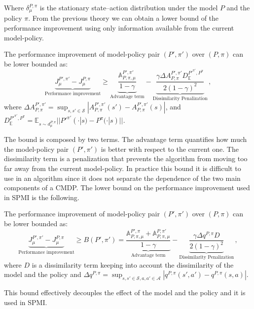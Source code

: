 Where $\delta_{\mu}^{P,\pi}$ is the stationary state--action distribution under the model $P$ and the policy $\pi$.
From the previous theory we can obtain a lower bound of the performance improvement using only information available from the current model-policy.
\begin{theorem}
The performance improvement of model-policy pair $(P',\pi')$ over $(P,\pi)$ can be lower bounded as:
\begin{equation}
	\underbrace{J_{\mu}^{P', \pi'} - J_{\mu}^{P, \pi}}_{\text{Performance improvement}} \geq \underbrace{\frac{\mathds{A}_{P,\pi, \mu}^{P',\pi'}}{1-\gamma}}_{\text{Advantage term}} - \underbrace{\frac{\gamma\Delta A^{P',\pi'}_{P,\pi}D_{\mathbb{E}}^{P'^{\pi'}, P^\pi}}{2 (1 -\gamma)^2}}_{\text{Dissimilarity Penalization}} \, ,
\end{equation}	
where $\Delta A^{P',\pi'}_{P,\pi} = \sup_{s,s' \in \mathcal{S}} \left|  A^{P',\pi'}_{P,\pi}(s') - A^{P',\pi'}_{P,\pi}(s) \right|$, and \newline $D_{\mathbb{E}}^{P'^{\pi'}, P^{\pi}} = \mathbb{E}_{s \sim d_{\mu}^{P,\pi}} || P'^{\pi'}(\cdot|s) - P^{\pi}(\cdot|s) ||$.
\end{theorem}
The bound is composed by two terms. The advantage term quantifies how much the model-policy pair $(P',\pi')$ is better with respect to the current one. The dissimilarity term is a penalization that prevents the algorithm from moving too far away from the current model-policy.
In practice this bound it is difficult to use in an algorithm since it does not separate the dependence of the two main components of a CMDP.
The lower bound on the performance improvement used in SPMI is the following.
\begin{theorem}
The performance improvement of model-policy pair $(P',\pi')$ over $(P,\pi)$ can be lower bounded as:
	\begin{equation}
	\underbrace{J_{\mu}^{P', \pi'} - J_{\mu}^{P, \pi}}_{\text{Performance improvement}} \geq B(P',\pi') = \underbrace{\frac{\mathds{A}_{P,\pi, \mu}^{P',\pi}+\mathds{A}_{P,\pi, \mu}^{P,\pi'}}{1-\gamma}}_{\text{Advantage term}}-\underbrace{\frac{\gamma\Delta q^{P,\pi}D}{2 (1 -\gamma)^2}}_{\text{Dissimilarity Penalization}} \, ,
	\label{eq:spmi-lower}
\end{equation}
where $D$ is a dissimilarity term keeping into account the dissimilarity of the model and the policy and $\Delta q^{P,\pi} = \sup_{s, s' \in \mathcal{S}, a, a' \in \mathcal{A}} \left| q^{P,\pi}(s',a') - q^{P,\pi}(s,a) \right|$.
\end{theorem}
This bound effectively decouples the effect of the model and the policy and it is used in SPMI.
